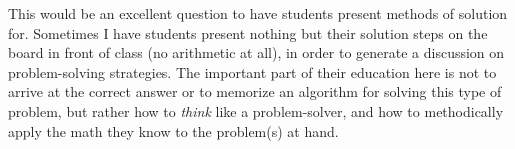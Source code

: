 





This would be an excellent question to have students present methods of solution for.  Sometimes I have students present nothing but their solution steps on the board in front of class (no arithmetic at all), in order to generate a discussion on problem-solving strategies.  The important part of their education here is not to arrive at the correct answer or to memorize an algorithm for solving this type of problem, but rather how to {\it think} like a problem-solver, and how to methodically apply the math they know to the problem(s) at hand.




